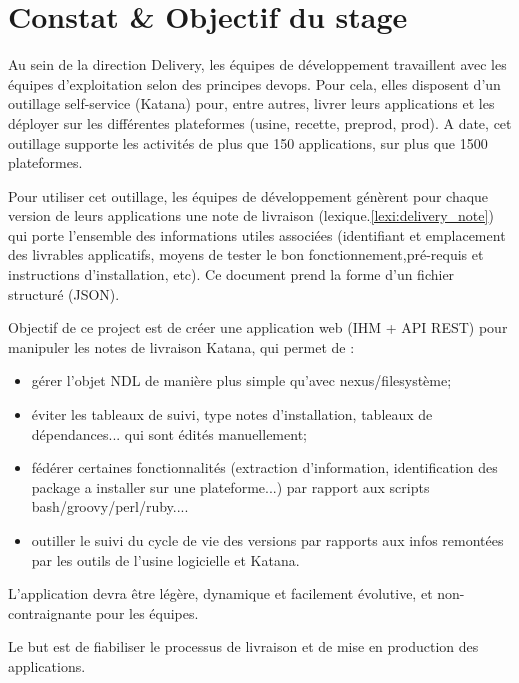 \section{Constat \& Objectif du stage}
Au sein de la direction Delivery, les équipes de développement travaillent avec les équipes d’exploitation selon des principes devops.
Pour cela, elles disposent d’un outillage self-service (Katana) pour, entre autres,
livrer leurs applications et les déployer sur les différentes plateformes (usine, recette, preprod, prod).
A date, cet outillage supporte les activités de plus que 150 applications, sur plus que 1500 plateformes.

Pour utiliser cet outillage,
les équipes de développement génèrent  pour chaque version de leurs applications une note de livraison (lexique.\ref{lexi:delivery_note}) qui porte l’ensemble des informations utiles associées
(identifiant et emplacement des livrables applicatifs, moyens de tester le bon fonctionnement,pré-requis et instructions d’installation, etc).
Ce document prend la forme d’un fichier structuré (JSON).

Objectif de ce project est de créer une application web (IHM + API REST) pour manipuler les notes de livraison Katana, qui permet de :

\begin{itemize}
 \item gérer l'objet NDL de manière plus simple qu'avec nexus/filesystème;
 \item éviter les tableaux de suivi, type notes d'installation, tableaux de dépendances... qui sont édités manuellement;
 \item fédérer certaines fonctionnalités (extraction d'information, identification des package a installer sur une plateforme...) par rapport aux scripts bash/groovy/perl/ruby....
 \item outiller le suivi du cycle de vie des versions par rapports aux infos remontées par les outils de l'usine logicielle et Katana.
\end{itemize}

L’application devra être légère, dynamique et facilement évolutive, et non-contraignante pour les équipes.

Le but est de fiabiliser le processus de livraison et de mise en production des applications.


